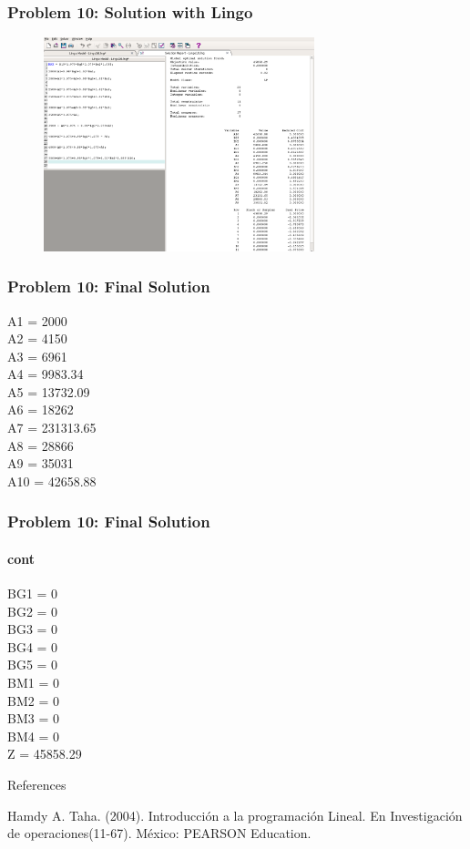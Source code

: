 \documentclass[10pt,svgnames,fragile]{beamer}
\begin{document}
\begin{frame}[label={sec:orge9abdcb}]{}

\frametitle{Problem 10: Solution with Lingo }
\begin{figure}
\includegraphics[width=0.7\textwidth]{images/10.png}
\end{figure}


\end{frame}

\begin{frame}[label={sec:org9c62e72}]{}
\frametitle{Problem 10: Final Solution}

A1 = 2000\\
A2 = 4150\\
A3 = 6961\\
A4 = 9983.34\\
A5 = 13732.09\\
A6 = 18262\\
A7 = 231313.65\\
A8 = 28866\\
A9 = 35031\\
A10 = 42658.88\\

\end{frame}

\begin{frame}[label={sec:org9c62e72}]{}
\frametitle{Problem 10: Final Solution}
\framesubtitle{cont}

BG1 = 0\\
BG2 = 0\\
BG3 = 0\\
BG4 = 0\\
BG5 = 0\\
BM1 = 0\\
BM2 = 0\\
BM3 = 0\\
BM4 = 0\\
Z = 45858.29

\end{frame}


\begin{frame}[label={sec:orgf10214b}]{References}


Hamdy A. Taha. (2004). Introducción a la programación Lineal. En Investigación de operaciones(11-67). México: PEARSON Education. 
\end{frame}
\end{document}
